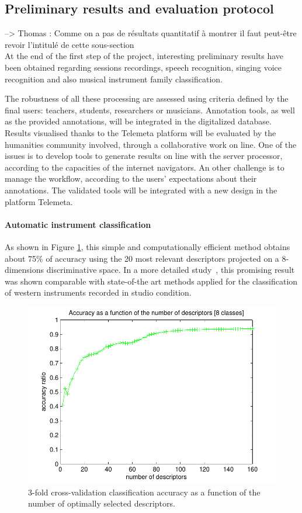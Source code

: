 \documentclass{sig-alternate}
\begin{document}
\subsection{Preliminary results and evaluation protocol}
{\color{red}  --> Thomas :
Comme on a pas de résultats quantitatif à montrer il faut peut-être revoir l'intitulé de cette sous-section}\\

At the end of the first step of the project, interesting preliminary results have been obtained regarding sessions recordings, speech recognition, singing voice recognition and also musical instrument family classification.

The robustness of all these processing are assessed using criteria defined by the final users: teachers, students, researchers or musicians. Annotation tools, as well as the provided annotations, will be integrated in the digitalized database. Results visualised thanks to the Telemeta platform will be evaluated by the humanities community involved, through a collaborative work on line. One of the issues is to develop tools to generate results on line with the server processor, according to the capacities of the internet navigators. An other challenge is to manage the workflow, according to the users' expectations about their annotations. The validated tools will be integrated with a new design in the platform Telemeta.

\paragraph{Automatic instrument classification}
As shown in Figure \ref{fig:inst_classif_result}, this simple and computationally efficient method obtains about 75\% of accuracy 
using the 20 most relevant descriptors projected on a 8-dimensions discriminative space. In a more detailed study~\cite{ismir14_dfourer},
this promising result was shown comparable with state-of-the art methods applied for the classification of western instruments recorded in studio condition.

\begin{figure}[!ht]
 \centering\includegraphics[width=0.7\linewidth]{img/crem_results}
 \caption{3-fold cross-validation classification accuracy as a function of the number of optimally selected descriptors.}
 \label{fig:inst_classif_result}
\end{figure}
\end{document}
